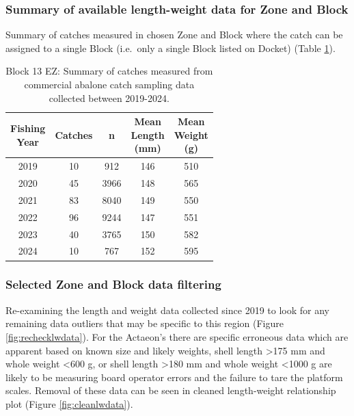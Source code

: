 \documentclass[
]{article}
\begin{document}
\subsubsection{Summary of available length-weight data for Zone and Block}\label{summary-of-available-length-weight-data-for-zone-and-block}

Summary of catches measured in chosen Zone and Block where the catch can be assigned to a single Block (i.e.~only a single Block listed on Docket) (Table \ref{tab:catchsamplesbyblock}).

\begin{table}[!h]
\centering
\caption{\label{tab:catchsamplesbyblock}Block 13 EZ: Summary of catches measured from commercial abalone catch sampling data collected between 2019-2024.}
\centering
\begin{tabular}[t]{ccccc}
\toprule
\makecell[c]{Fishing\\Year} & Catches & n & \makecell[c]{Mean\\Length\\(mm)} & \makecell[c]{Mean\\Weight\\(g)}\\
\midrule
2019 & 10 & 912 & 146 & 510\\
2020 & 45 & 3966 & 148 & 565\\
2021 & 83 & 8040 & 149 & 550\\
2022 & 96 & 9244 & 147 & 551\\
2023 & 40 & 3765 & 150 & 582\\
2024 & 10 & 767 & 152 & 595\\
\bottomrule
\end{tabular}
\end{table}

\subsubsection{Selected Zone and Block data filtering}\label{selected-zone-and-block-data-filtering}

Re-examining the length and weight data collected since 2019 to look for any remaining data outliers that may be specific to this region (Figure \ref{fig:rechecklwdata}). For the Actaeon's there are specific erroneous data which are apparent based on known size and likely weights, shell length \textgreater175 mm and whole weight \textless600 g, or shell length \textgreater180 mm and whole weight \textless1000 g are likely to be measuring board operator errors and the failure to tare the platform scales. Removal of these data can be seen in cleaned length-weight relationship plot (Figure \ref{fig:cleanlwdata}).
\end{document}
